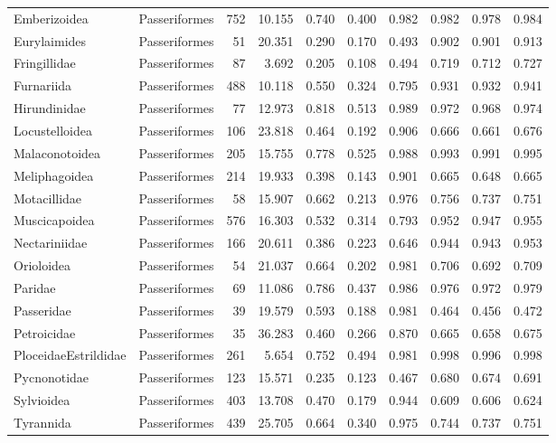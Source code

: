 \begin{longtable}{llrrrrrrrr}
  Emberizoidea & Passeriformes &  752 & 10.155 & 0.740 & 0.400 & 0.982 & 0.982 & 0.978 & 0.984 \\ 
  Eurylaimides & Passeriformes &   51 & 20.351 & 0.290 & 0.170 & 0.493 & 0.902 & 0.901 & 0.913 \\ 
  Fringillidae & Passeriformes &   87 & 3.692 & 0.205 & 0.108 & 0.494 & 0.719 & 0.712 & 0.727 \\ 
  Furnariida & Passeriformes &  488 & 10.118 & 0.550 & 0.324 & 0.795 & 0.931 & 0.932 & 0.941 \\ 
  Hirundinidae & Passeriformes &   77 & 12.973 & 0.818 & 0.513 & 0.989 & 0.972 & 0.968 & 0.974 \\ 
  Locustelloidea & Passeriformes &  106 & 23.818 & 0.464 & 0.192 & 0.906 & 0.666 & 0.661 & 0.676 \\ 
  Malaconotoidea & Passeriformes &  205 & 15.755 & 0.778 & 0.525 & 0.988 & 0.993 & 0.991 & 0.995 \\ 
  Meliphagoidea & Passeriformes &  214 & 19.933 & 0.398 & 0.143 & 0.901 & 0.665 & 0.648 & 0.665 \\ 
  Motacillidae & Passeriformes &   58 & 15.907 & 0.662 & 0.213 & 0.976 & 0.756 & 0.737 & 0.751 \\ 
  Muscicapoidea & Passeriformes &  576 & 16.303 & 0.532 & 0.314 & 0.793 & 0.952 & 0.947 & 0.955 \\ 
  Nectariniidae & Passeriformes &  166 & 20.611 & 0.386 & 0.223 & 0.646 & 0.944 & 0.943 & 0.953 \\ 
  Orioloidea & Passeriformes &   54 & 21.037 & 0.664 & 0.202 & 0.981 & 0.706 & 0.692 & 0.709 \\ 
  Paridae & Passeriformes &   69 & 11.086 & 0.786 & 0.437 & 0.986 & 0.976 & 0.972 & 0.979 \\ 
  Passeridae & Passeriformes &   39 & 19.579 & 0.593 & 0.188 & 0.981 & 0.464 & 0.456 & 0.472 \\ 
  Petroicidae & Passeriformes &   35 & 36.283 & 0.460 & 0.266 & 0.870 & 0.665 & 0.658 & 0.675 \\ 
  PloceidaeEstrildidae & Passeriformes &  261 & 5.654 & 0.752 & 0.494 & 0.981 & 0.998 & 0.996 & 0.998 \\ 
  Pycnonotidae & Passeriformes &  123 & 15.571 & 0.235 & 0.123 & 0.467 & 0.680 & 0.674 & 0.691 \\ 
  Sylvioidea & Passeriformes &  403 & 13.708 & 0.470 & 0.179 & 0.944 & 0.609 & 0.606 & 0.624 \\ 
  Tyrannida & Passeriformes &  439 & 25.705 & 0.664 & 0.340 & 0.975 & 0.744 & 0.737 & 0.751 \\ 

\end{longtable}
